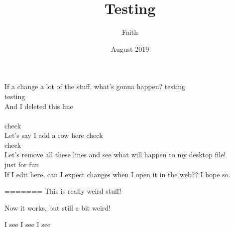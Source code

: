 \documentclass{article}
\title{Testing}
\date{August 2019}
\author{Faith}
\begin{document}
\maketitle
If a change a lot of the stuff, what's gonna happen?
testing \\
testing\\
And I deleted this line
\\
\\
check\\


Let's say I add a row here
check\\
check\\
Let's remove all these lines and see what will happen to my desktop file!
\\
just for fun
\\

If I edit here, can I expect changes when I open it in the web?? I hope so.


=======
This is really weird stuff!


Now it works, but still a bit weird!

I see I see I see 
\end{document}
